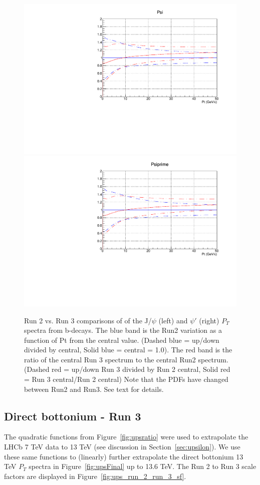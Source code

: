 \documentclass[12pt]{article}
\begin{document}
     \begin{figure}[H]
  \begin{center}
    \includegraphics[width=0.45\linewidth]{../oniaFromB/psi_fromB_Run2_Run3_comparison.pdf}
    \includegraphics[width=0.45\linewidth]{../oniaFromB/psiprime_fromB_Run2_Run3_comparison.pdf}
    
    \caption{\protect Run 2 vs. Run 3 comparisons of of the J/$\psi$ (left) and 
      $\psi'$ (right) $P_T$ spectra 
      from b-decays.  The blue band is the Run2 variation as a function of Pt from the central value. 
(Dashed blue = up/down divided by central, Solid blue = central = 1.0). 
The red band is the ratio of the central Run 3 spectrum to the central Run2 spectrum. 
(Dashed red = up/down Run 3 divided by Run 2 central, Solid red = Run 3 central/Run 2 central) 
Note that the PDFs have changed between Run2 and Run3.  See text for details.}
\label{fig:psi_run_comparison}
\end{center}
\end{figure}

\clearpage

\subsection{Direct bottonium - Run 3}
\label{sec:upsilon3}
The quadratic functions from Figure~\ref{fig:upsratio} were used to extrapolate
the LHCb 7 TeV data to 13 TeV (see discussion in Section~\ref{sec:upsilon}).
We use these same functions to (linearly) further extrapolate 
the direct bottonium 13 TeV $P_T$ spectra in
Figure~\ref{fig:upsFinal} up to 13.6 TeV.  The Run 2 to Run 3 scale factors are
displayed in Figure~\ref{fig:ups_run_2_run_3_sf}.
\end{document}
